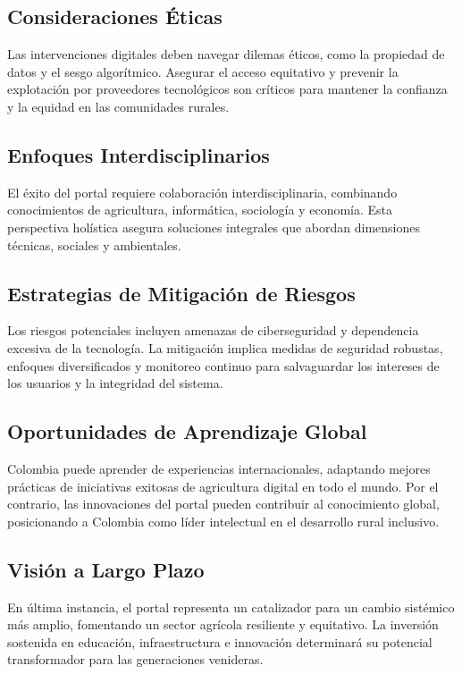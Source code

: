 \subsection{Consideraciones Éticas}
Las intervenciones digitales deben navegar dilemas éticos, como la propiedad de datos y el sesgo algorítmico. Asegurar el acceso equitativo y prevenir la explotación por proveedores tecnológicos son críticos para mantener la confianza y la equidad en las comunidades rurales.

\subsection{Enfoques Interdisciplinarios}
El éxito del portal requiere colaboración interdisciplinaria, combinando conocimientos de agricultura, informática, sociología y economía. Esta perspectiva holística asegura soluciones integrales que abordan dimensiones técnicas, sociales y ambientales.

\subsection{Estrategias de Mitigación de Riesgos}
Los riesgos potenciales incluyen amenazas de ciberseguridad y dependencia excesiva de la tecnología. La mitigación implica medidas de seguridad robustas, enfoques diversificados y monitoreo continuo para salvaguardar los intereses de los usuarios y la integridad del sistema.

\subsection{Oportunidades de Aprendizaje Global}
Colombia puede aprender de experiencias internacionales, adaptando mejores prácticas de iniciativas exitosas de agricultura digital en todo el mundo. Por el contrario, las innovaciones del portal pueden contribuir al conocimiento global, posicionando a Colombia como líder intelectual en el desarrollo rural inclusivo.

\subsection{Visión a Largo Plazo}
En última instancia, el portal representa un catalizador para un cambio sistémico más amplio, fomentando un sector agrícola resiliente y equitativo. La inversión sostenida en educación, infraestructura e innovación determinará su potencial transformador para las generaciones venideras.
